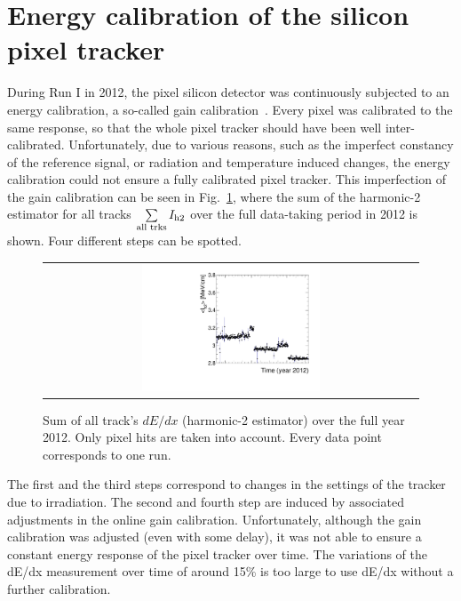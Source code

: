 \section{Energy calibration of the silicon pixel tracker}
During Run I in 2012, the pixel silicon detector was continuously subjected to an energy calibration, a so-called gain calibration~\cite{bib:Danek}.
Every pixel was calibrated to the same response, so that the whole pixel tracker should have been well inter-calibrated.
Unfortunately, due to various reasons, such as the imperfect constancy of the reference signal, or radiation and temperature induced changes, the energy calibration could not ensure a fully calibrated pixel tracker.
This imperfection of the gain calibration can be seen in Fig.~\ref{fig:StabilityPlot_beforeCalibration}, where the sum of the harmonic-2 estimator for all tracks $\sum\limits_{\text{all trks}}I_{\text{h2}}$ over the full data-taking period in 2012 is shown.
Four different steps can be spotted.
\begin{figure}[!t]
  \centering 
  \begin{tabular}{c}
  \includegraphics[width=0.49\textwidth]{figures/analysis/PixelCalibration/StabilityPlot_Pixel_beforeCalibration_withoutStepFits_NEW.pdf}
  \end{tabular}
  \caption{Sum of all track's $dE/dx$ (harmonic-2 estimator) over the full year 2012. Only pixel hits are taken into account. Every data point corresponds to one run.} 
  \label{fig:StabilityPlot_beforeCalibration}
\end{figure}
The first and the third steps correspond to changes in the settings of the tracker due to irradiation.
The second and fourth step are induced by associated adjustments in the online gain calibration.
Unfortunately, although the gain calibration was adjusted (even with some delay), it was not able to ensure a constant energy response of the pixel tracker over time. 
The variations of the dE/dx measurement over time of around 15\% is too large to use dE/dx without a further calibration. 


